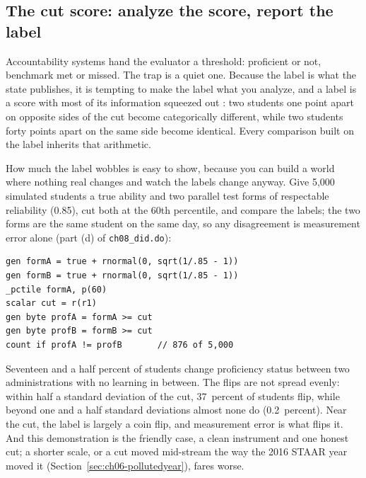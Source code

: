 \subsection{The cut score: analyze the score, report the label}\label{ch08-sc-cutscore}
Accountability systems hand the evaluator a threshold: proficient or not, benchmark met or missed. The trap is a quiet one. Because the label is what the state publishes, it is tempting to make the label what you analyze, and a label is a score with most of its information squeezed out \parencite{osborne2013cleaning}: two students one point apart on opposite sides of the cut become categorically different, while two students forty points apart on the same side become identical. Every comparison built on the label inherits that arithmetic.

How much the label wobbles is easy to show, because you can build a world where nothing real changes and watch the labels change anyway. Give 5{,}000 simulated students a true ability and two parallel test forms of respectable reliability (0.85), cut both at the 60th percentile, and compare the labels; the two forms are the same student on the same day, so any disagreement is measurement error alone (part (d) of \texttt{ch08\_did.do}):
\par
{\footnotesize
\begin{verbatim}
gen formA = true + rnormal(0, sqrt(1/.85 - 1))
gen formB = true + rnormal(0, sqrt(1/.85 - 1))
_pctile formA, p(60)
scalar cut = r(r1)
gen byte profA = formA >= cut
gen byte profB = formB >= cut
count if profA != profB       // 876 of 5,000
\end{verbatim}
}
Seventeen and a half percent of students change proficiency status between two administrations with no learning in between. The flips are not spread evenly: within half a standard deviation of the cut, 37~percent of students flip, while beyond one and a half standard deviations almost none do (0.2~percent). Near the cut, the label is largely a coin flip, and measurement error is what flips it. And this demonstration is the friendly case, a clean instrument and one honest cut; a shorter scale, or a cut moved mid-stream the way the 2016 STAAR year moved it (Section~\ref{sec:ch06-pollutedyear}), fares worse.

